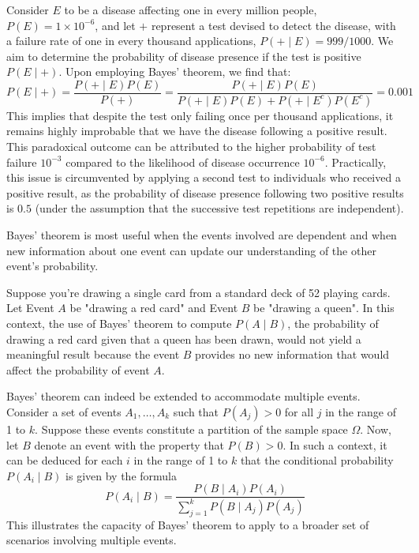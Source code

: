 \begin{example}
Consider $E$ to be a disease affecting one in every million people, $P(E) = 1 \times 10^{-6}$, and let $+$ represent a test devised to detect the disease, with a failure rate of one in every thousand applications, $P(+ \mid E) = 999/1000$. We aim to determine the probability of disease presence if the test is positive $P(E \mid +)$. Upon employing Bayes' theorem, we find that:
\[
P(E \mid +) = \frac{P(+ \mid E) P(E)}{P(+)} = \frac{P(+ \mid E) P(E)}{P(+ \mid E) P(E) + P(+ \mid E^c) P(E^c)} = 0.001
\]
This implies that despite the test only failing once per thousand applications, it remains highly improbable that we have the disease following a positive result. This paradoxical outcome can be attributed to the higher probability of test failure $10^{-3}$ compared to the likelihood of disease occurrence $10^{-6}$. Practically, this issue is circumvented by applying a second test to individuals who received a positive result, as the probability of disease presence following two positive results is $0.5$ (under the assumption that the successive test repetitions are independent).
\end{example}

Bayes' theorem is most useful when the events involved are dependent and when new information about one event can update our understanding of the other event's probability.

\begin{example}
Suppose you're drawing a single card from a standard deck of 52 playing cards. Let Event $A$ be "drawing a red card" and Event $B$ be "drawing a queen". In this context, the use of Bayes' theorem to compute $P(A \mid B)$, the probability of drawing a red card given that a queen has been drawn, would not yield a meaningful result because the event $B$ provides no new information that would affect the probability of event $A$.
\end{example}

Bayes' theorem can indeed be extended to accommodate multiple events. Consider a set of events $A_{1}, \ldots, A_{k}$ such that $P\left( A_{j} \right)>0$ for all $j$ in the range of 1 to $k$. Suppose these events constitute a partition of the sample space $\Omega$. Now, let $B$ denote an event with the property that $P\left(B\right)>0$. In such a context, it can be deduced for each $i$ in the range of 1 to $k$ that the conditional probability $P\left(A_{i}\mid B\right)$ is given by the formula
\[
P\left(A_{i}\mid B\right)=\frac{P\left(B\mid A_{i}\right) P\left(A_{i}\right)}{\sum_{j=1}^{k} P\left(B \mid A_{j}\right) P\left(A_{j}\right)}
\]
This illustrates the capacity of Bayes' theorem to apply to a broader set of scenarios involving multiple events.

